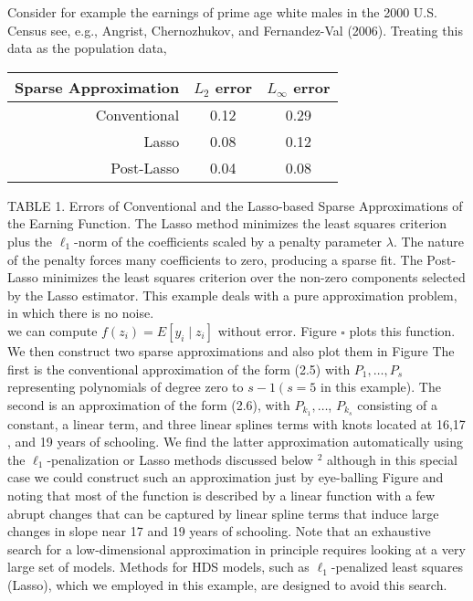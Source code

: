\documentclass[10pt]{article}
\begin{document}
Consider for example the earnings of prime age white males in the 2000 U.S. Census see, e.g., Angrist, Chernozhukov, and Fernandez-Val (2006). Treating this data as the population data,

\begin{center}
\begin{tabular}{rcc}
\hline\hline
Sparse Approximation & \(L_{2}\) error & \(L_{\infty}\) error \\
\hline
Conventional & 0.12 & 0.29 \\
Lasso & 0.08 & 0.12 \\
Post-Lasso & 0.04 & 0.08 \\
\hline\hline
\end{tabular}
\end{center}

TABLE 1. Errors of Conventional and the Lasso-based Sparse Approximations of the Earning Function. The Lasso method minimizes the least squares criterion plus the \(\ell_{1}\)-norm of the coefficients scaled by a penalty parameter \(\lambda\). The nature of the penalty forces many coefficients to zero, producing a sparse fit. The Post-Lasso minimizes the least squares criterion over the non-zero components selected by the Lasso estimator. This example deals with a pure approximation problem, in which there is no noise.\\
we can compute \(f\left(z_{i}\right)=E\left[y_{i} \mid z_{i}\right]\) without error. Figure \(\square\) plots this function. We then construct two sparse approximations and also plot them in Figure The first is the conventional approximation of the form (2.5) with \(P_{1}, \ldots, P_{s}\) representing polynomials of degree zero to \(s-1\left(s=5\right.\) in this example). The second is an approximation of the form (2.6), with \(P_{k_{1}}, \ldots\), \(P_{k_{s}}\) consisting of a constant, a linear term, and three linear splines terms with knots located at 16,17 , and 19 years of schooling. We find the latter approximation automatically using the \(\ell_{1}\)-penalization or Lasso methods discussed below \({ }^{2}\) although in this special case we could construct such an approximation just by eye-balling Figure and noting that most of the function is described by a linear function with a few abrupt changes that can be captured by linear spline terms that induce large changes in slope near 17 and 19 years of schooling. Note that an exhaustive search for a low-dimensional approximation in principle requires looking at a very large set of models. Methods for HDS models, such as \(\ell_{1}\)-penalized least squares (Lasso), which we employed in this example, are designed to avoid this search.
\end{document}
